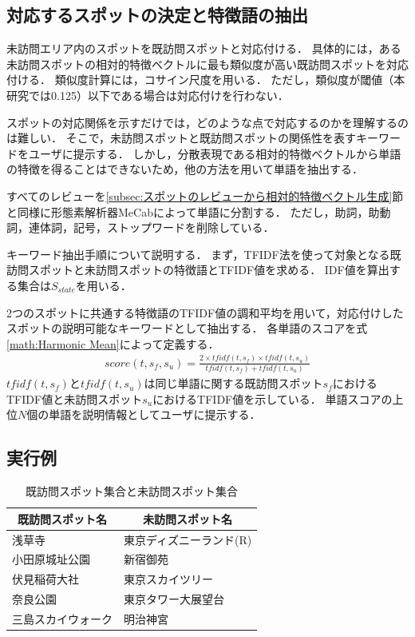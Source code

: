\documentclass[submit]{ipsj}
\begin{document}
\subsection{対応するスポットの決定と特徴語の抽出}
\label{subsec:対応するスポットの決定と特徴語の抽出}
未訪問エリア内のスポットを既訪問スポットと対応付ける．
具体的には，ある未訪問スポットの相対的特徴ベクトルに最も類似度が高い既訪問スポットを対応付ける．
類似度計算には，コサイン尺度を用いる．
ただし，類似度が閾値（本研究では0.125）以下である場合は対応付けを行わない．

スポットの対応関係を示すだけでは，どのような点で対応するのかを理解するのは難しい．
そこで，未訪問スポットと既訪問スポットの関係性を表すキーワードをユーザに提示する．
しかし，分散表現である相対的特徴ベクトルから単語の特徴を得ることはできないため，他の方法を用いて単語を抽出する．

すべてのレビューを\ref{subsec:スポットのレビューから相対的特徴ベクトル生成}節と同様に形態素解析器MeCabによって単語に分割する．
ただし，助詞，助動詞，連体詞，記号，ストップワードを削除している．

キーワード抽出手順について説明する．
まず，TFIDF法を使って対象となる既訪問スポットと未訪問スポットの特徴語とTFIDF値を求める．
IDF値を算出する集合は$S_{state}$を用いる．

2つのスポットに共通する特徴語のTFIDF値の調和平均を用いて，対応付けしたスポットの説明可能なキーワードとして抽出する．
各単語のスコアを式\ref{math:Harmonic Mean}によって定義する．
\begin{eqnarray}
  score(t,s_f,s_u) = \frac{2 \times tfidf(t,s_f) \times tfidf(t,s_u)}{tfidf(t,s_f) + tfidf(t,s_u)}
  \label{math:Harmonic Mean}
\end{eqnarray}
$tfidf(t,s_f)$と$tfidf(t,s_u)$は同じ単語に関する既訪問スポット$s_f$におけるTFIDF値と未訪問スポット$s_u$におけるTFIDF値を示している．
単語スコアの上位$N$個の単語を説明情報としてユーザに提示する．

\subsection{実行例}
\label{subsec:実行例}
\begin{table}[t]
  \caption{既訪問スポット集合と未訪問スポット集合}
  \label{table:既訪問スポット集合と未訪問スポット集合}
  \centering
  \begin{tabular}{l|l}
  \hline  \hline
  \multicolumn{1}{c|}{既訪問スポット名} & \multicolumn{1}{c}{未訪問スポット名} \\ \hline
  浅草寺                           & 東京ディズニーランド(R)                \\
  小田原城址公園                       & 新宿御苑                         \\
  伏見稲荷大社                        & 東京スカイツリー                     \\
  奈良公園                          & 東京タワー大展望台                    \\
  三島スカイウォーク                     & 明治神宮                         \\ \hline
  \end{tabular}
\end{table}
\end{document}
